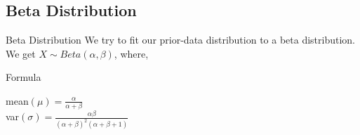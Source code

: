 \documentclass{beamer}
\begin{document}
\begin{frame}
\section{Beta Distribution}
\end{frame}

\begin{frame}{Beta Distribution}
We try to fit our prior-data distribution to a beta distribution.\\
We get $X \sim Beta(\alpha, \beta)$, where,
\begin{block}{Formula}
    \begin{center}
    mean$(\mu) = \frac{\alpha}{\alpha + \beta}$ \\
    var$(\sigma) = \frac{\alpha\beta}{(\alpha + \beta)^2(\alpha + \beta + 1)}$
\end{center}
\end{block}
\end{frame}
\end{document}
